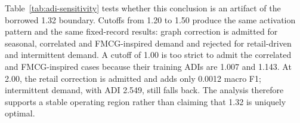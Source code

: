 Table~\ref{tab:adi-sensitivity} tests whether this conclusion is an artifact of the borrowed 1.32 boundary. Cutoffs from 1.20 to 1.50 produce the same activation pattern and the same fixed-record results: graph correction is admitted for seasonal, correlated and FMCG-inspired demand and rejected for retail-driven and intermittent demand. A cutoff of 1.00 is too strict to admit the correlated and FMCG-inspired cases because their training ADIs are 1.007 and 1.143. At 2.00, the retail correction is admitted and adds only 0.0012 macro F1; intermittent demand, with ADI 2.549, still falls back. The analysis therefore supports a stable operating region rather than claiming that 1.32 is uniquely optimal.

\begin{table}[tb]\centering\scriptsize
\caption{Sensitivity of fixed-realization macro-F1 differences (selected framework minus local expert) to the ADI cutoff. S, C, F, R and I denote seasonal, correlated, FMCG-inspired, retail-driven and intermittent demand.}\label{tab:adi-sensitivity}
\end{table}

